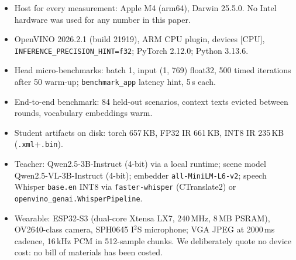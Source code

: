 \documentclass{article}
\newcommand{\fn}[1]{\texttt{#1}}
\begin{document}
\begin{itemize}
\item Host for every measurement: Apple M4 (arm64), Darwin 25.5.0. No Intel
hardware was used for any number in this paper.
\item OpenVINO 2026.2.1 (build 21919), ARM CPU plugin, devices [CPU],
\fn{INFERENCE\_PRECISION\_HINT=f32}; PyTorch 2.12.0; Python 3.13.6.
\item Head micro-benchmarks: batch 1, input (1, 769) float32, 500 timed
iterations after 50 warm-up; \fn{benchmark\_app} latency hint, 5\,s each.
\item End-to-end benchmark: 84 held-out scenarios, context texts evicted
between rounds, vocabulary embeddings warm.
\item Student artifacts on disk: torch 657\,KB, FP32 IR 661\,KB, INT8 IR
235\,KB (\fn{.xml}+\fn{.bin}).
\item Teacher: Qwen2.5-3B-Instruct (4-bit) via a local runtime; scene model
Qwen2.5-VL-3B-Instruct (4-bit); embedder \fn{all-MiniLM-L6-v2}; speech
Whisper \fn{base.en} INT8 via \fn{faster-whisper} (CTranslate2) or
\fn{openvino\_genai.WhisperPipeline}.
\item Wearable: ESP32-S3 (dual-core Xtensa LX7, 240\,MHz, 8\,MB PSRAM),
OV2640-class camera, SPH0645 I$^2$S microphone; VGA JPEG at 2000\,ms cadence,
16\,kHz PCM in 512-sample chunks. We deliberately quote no device
cost: no bill of materials has been costed.
\end{itemize}
\end{document}
